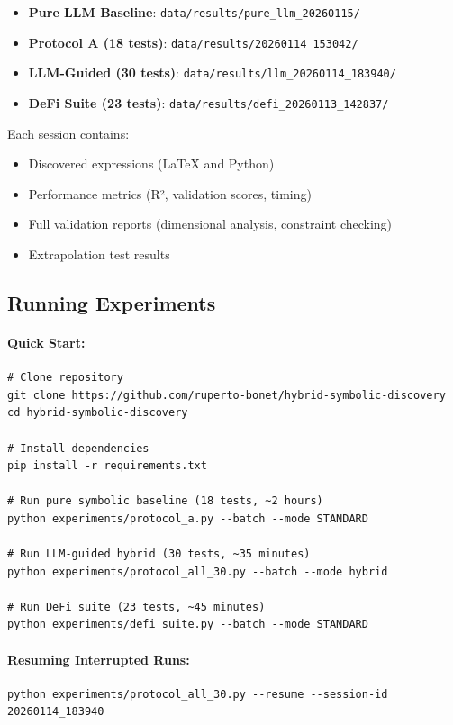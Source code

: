 \begin{itemize}
\item \textbf{Pure LLM Baseline}: \texttt{data/results/pure\_llm\_20260115/}
\item \textbf{Protocol A (18 tests)}: \texttt{data/results/20260114\_153042/}
\item \textbf{LLM-Guided (30 tests)}: \texttt{data/results/llm\_20260114\_183940/}
\item \textbf{DeFi Suite (23 tests)}: \texttt{data/results/defi\_20260113\_142837/}
\end{itemize}

Each session contains:
\begin{itemize}
\item Discovered expressions (LaTeX and Python)
\item Performance metrics (R², validation scores, timing)
\item Full validation reports (dimensional analysis, constraint checking)
\item Extrapolation test results
\end{itemize}

\subsection{Running Experiments}

\paragraph{Quick Start:}
\begin{small}
\begin{verbatim}
# Clone repository
git clone https://github.com/ruperto-bonet/hybrid-symbolic-discovery
cd hybrid-symbolic-discovery

# Install dependencies
pip install -r requirements.txt

# Run pure symbolic baseline (18 tests, ~2 hours)
python experiments/protocol_a.py --batch --mode STANDARD

# Run LLM-guided hybrid (30 tests, ~35 minutes)
python experiments/protocol_all_30.py --batch --mode hybrid

# Run DeFi suite (23 tests, ~45 minutes)
python experiments/defi_suite.py --batch --mode STANDARD
\end{verbatim}
\end{small}

\paragraph{Resuming Interrupted Runs:}
\begin{small}
\begin{verbatim}
python experiments/protocol_all_30.py --resume --session-id 20260114_183940
\end{verbatim}
\end{small}

